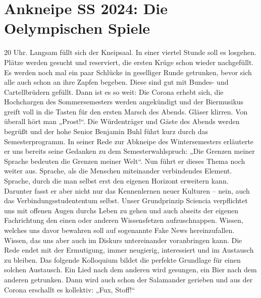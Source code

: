\section{Ankneipe SS 2024: Die Oelympischen Spiele}




\begin{multicols}{2}

	20 Uhr. Langsam füllt sich der Kneipsaal. In einer viertel Stunde soll es losgehen. Plätze werden gesucht und reserviert, die ersten Krüge schon wieder nachgefüllt. 
Es werden noch mal ein paar Schlücke in geselliger Runde getrunken, bevor sich alle auch schon an ihre Zapfen begeben. Diese sind gut mit Bundes- und Cartellbrüdern gefüllt. 
Dann ist es so weit: Die Corona erhebt sich, die Hochchargen des Sommersemesters werden angekündigt und der Biermusikus greift voll in die Tasten für den ersten Marsch des Abends.
Gläser klirren. Von überall hört man „Prost!“. Die Würdenträger und Gäste des Abends werden begrüßt und der hohe Senior Benjamin Buhl führt kurz durch das Semesterprogramm. In seiner Rede zur Abkneipe des Wintersemesters erläuterte er uns bereits seine Gedanken zu dem Semesterwahlspruch: „Die Grenzen meiner Sprache bedeuten die Grenzen meiner Welt“. Nun führt er dieses Thema noch weiter aus. Sprache, als die Menschen miteinander verbindendes Element. Sprache, durch die man selbst erst den eigenen Horizont erweitern kann. Darunter fasst er aber nicht nur das Kennenlernen neuer Kulturen – nein, auch das Verbindungsstudententum selbst. Unser Grundprinzip Sciencia verpflichtet uns mit offenen Augen durchs Leben zu gehen und auch abseits der eigenen Fachrichtung den einen oder anderen Wissensfetzen aufzuschnappen. Wissen, welches uns davor bewahren soll auf sogenannte Fake News hereinzufallen. Wissen, das uns aber auch im Diskurs untereinander voranbringen kann. Die Rede endet mit der Ermutigung, immer neugierig, interessiert und im Austausch zu bleiben. Das folgende Kolloquium bildet die perfekte Grundlage für einen solchen Austausch.
Ein Lied nach dem anderen wird gesungen, ein Bier nach dem anderen getrunken.
Dann wird auch schon der Salamander gerieben und aus der Corona erschallt es kollektiv: „Fux, Stoff!“

\end{multicols}
